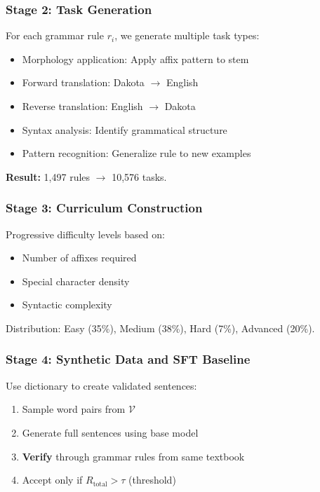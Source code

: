 \documentclass{article}
\newcommand{\Rtotal}{R_{\text{total}}}
\begin{document}
\subsubsection{Stage 2: Task Generation}

For each grammar rule $r_i$, we generate multiple task types:
\begin{itemize}
    \item Morphology application: Apply affix pattern to stem
    \item Forward translation: Dakota $\rightarrow$ English
    \item Reverse translation: English $\rightarrow$ Dakota
    \item Syntax analysis: Identify grammatical structure
    \item Pattern recognition: Generalize rule to new examples
\end{itemize}

\textbf{Result:} 1,497 rules $\rightarrow$ 10,576 tasks.

\subsubsection{Stage 3: Curriculum Construction}

Progressive difficulty levels based on:
\begin{itemize}
    \item Number of affixes required
    \item Special character density
    \item Syntactic complexity
\end{itemize}

Distribution: Easy (35\%), Medium (38\%), Hard (7\%), Advanced (20\%).

\subsubsection{Stage 4: Synthetic Data and SFT Baseline}

Use dictionary to create validated sentences:
\begin{enumerate}
    \item Sample word pairs from $\mathcal{V}$
    \item Generate full sentences using base model
    \item \textbf{Verify} through grammar rules from same textbook
    \item Accept only if $\Rtotal > \tau$ (threshold)
\end{enumerate}
\end{document}
